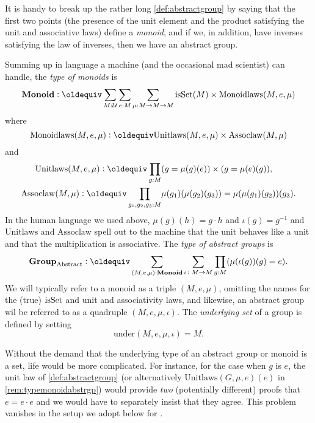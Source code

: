   \begin{remark}
    It is handy to break up the rather long \cref{def:abstractgroup}  by saying that the first two points (\ie the presence of the unit element and the product satisfying the unit and associative laws) define a \emph{monoid}, and if we, in addition, have inverses satisfying the law of inverses, then we have an abstract group.
    \end{remark}


    \begin{remark}\label{rem:typemonoidabstrgp}
        Summing up in language a machine (and the occasional mad scientist) can handle, the \emph{type of monoids} is
$$\typemonoid\defequi \sum_{M:\UU}\sum_{e:M}\sum_{\mu{}:M\to M\to M}
\isset{(M)}\times\mathrm{Monoidlaws}(M,e,\mu)
$$
where
$$\mathrm{Monoidlaws}(M,e,\mu)\defequi\mathrm{Unitlaws}(M,e,\mu)\times\mathrm{Assoclaw}(M,\mu{})$$and
\begin{align*}
  \mathrm{Unitlaws}(M,e,\mu)\defequi\prod_{g:M}
&(g=\mu{}(g)(e))\times(g=\mu{}(e)(g)),\\
\mathrm{Assoclaw}(M,\mu{})\defequi\prod_{g_1,g_2,g_3:M}&\mu{}(g_1)(\mu{}(g_2)(g_3))=\mu{}(\mu{}(g_1)(g_2))(g_3).
\end{align*}
In the human language we used above, $\mu(g)(h)=g\cdot h$ and $\iota(g)=g^{-1}$ and $\mathrm{Unitlaws}$ and $\mathrm{Assoclaw}$ spell out to the machine that the unit behaves like a unit and that the multiplication is associative.
The
\emph{type of abstract groups} is
$$\typeabsgp\defequi
\sum_{(M,e,\mu):\typemonoid}\sum_{\iota\colon M\to M}\prod_{g:M}(\mu{}(\iota{}(g))(g)=e).$$
We will typically refer to a monoid as a triple $(M,e,\mu)$, omitting the names for the (true) $\mathrm{isSet}$ and unit and associativity laws, and likewise, an abstract group wil be referred to as a quadruple $(M,e,\mu,\iota)$.  The \emph{underlying set} of a group is defined by setting 
$$\mathrm{under}(M,e,\mu,\iota)=M.$$
\end{remark}
  \begin{remark}
Without the demand that the underlying type of an abstract group or monoid is a set, life would be more complicated.  For instance, for the case when $g$ is $e$, the unit law of \cref{def:abstractgroup} (or alternatively $\mathrm{Unitlaws}(G,\mu{},e)(e)$ in \cref{rem:typemonoidabstrgp}) would provide \emph{two} (potentially different) proofs that $e=e\cdot e$ and we would have to separately insist that they agree.  This problem vanishes in the setup we adopt below for \inftygps.
  \end{remark}

